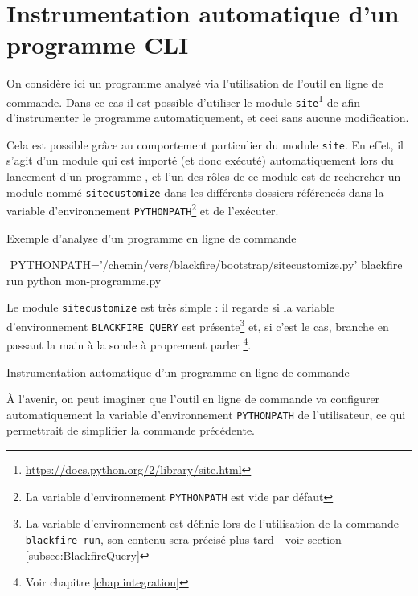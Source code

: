 \section[Programme CLI]{Instrumentation automatique d'un programme CLI}
\label{sec:instru-pythonpath}
On considère ici un programme analysé via l'utilisation de l'outil en ligne de commande. Dans ce cas il est possible d'utiliser le module \verb|site|\footnote{\url{https://docs.python.org/2/library/site.html}} de \Python afin d'instrumenter le programme automatiquement, et ceci sans aucune modification.

Cela est possible grâce au comportement particulier du module \verb|site|. En effet, il s'agit d'un module qui est importé (et donc exécuté) automatiquement lors du lancement d'un programme \Python, et l'un des rôles de ce module est de rechercher un module nommé \verb|sitecustomize| dans les différents dossiers référencés dans la variable d'environnement \verb|PYTHONPATH|\footnote{La variable d'environnement \verb?PYTHONPATH? est vide par défaut} et de l'exécuter.

\begin{listing}[H]
\caption{Exemple d'analyse d'un programme en ligne de commande}
\begin{bashcode}
 $ $ PYTHONPATH='/chemin/vers/blackfire/bootstrap/sitecustomize.py' blackfire run python mon-programme.py
\end{bashcode}
\end{listing}

Le module \verb|sitecustomize| est très simple : il regarde si la variable d'environnement \verb|BLACKFIRE_QUERY| est présente\footnote{La variable d'environnement est définie lors de l'utilisation de la commande \verb|blackfire run|, son contenu sera précisé plus tard - voir section \vref{subsec:BlackfireQuery}} et, si c'est le cas, branche \Blackfire en passant la main à la sonde à proprement parler \footnote{Voir chapitre \vref{chap:integration}}.

\begin{listing}[H]
\caption{Instrumentation automatique d'un programme en ligne de commande}
\end{listing}

\begin{note}
À l'avenir, on peut imaginer que l'outil en ligne de commande \Blackfire va configurer automatiquement la variable d'environnement \verb|PYTHONPATH| de l'utilisateur, ce qui permettrait de simplifier la commande précédente.
\end{note}

